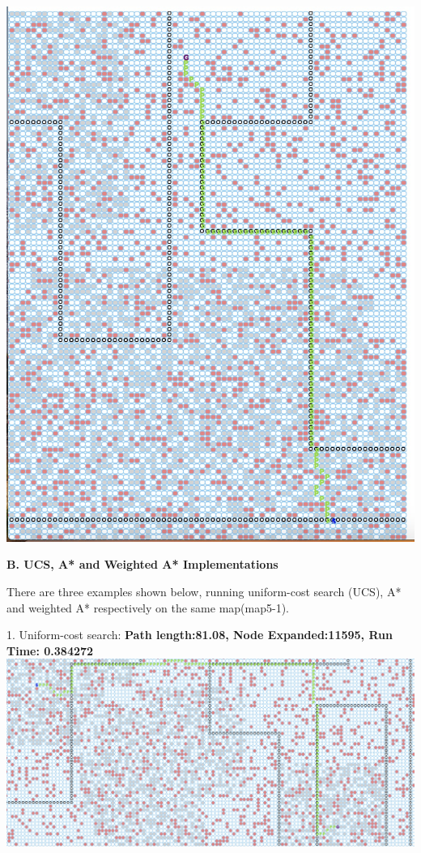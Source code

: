 \documentclass[12pt, letterpaper]{article}
\begin{document}
\medskip

\includegraphics[scale=0.40]{"a-map1-4"}


\pagebreak %


\noindent \textbf{B. UCS, A* and Weighted A* Implementations}

There are three examples shown below, running uniform-cost search (UCS), A* and weighted A* respectively on the same map(map5-1).

1. Uniform-cost search:\newline
\medskip
\textbf{Path length:81.08, Node Expanded:11595,	Run Time: 0.384272}\newline
\noindent \includegraphics[scale=0.2]{"b-map5-1-u"}\newline
\end{document}
